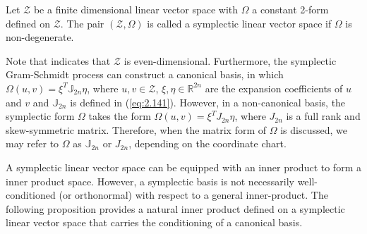 \begin{definition}
Let $\mathcal Z$ be a finite dimensional linear vector space with $\Omega$ a constant 2-form defined on $\mathcal Z$. The pair $(\mathcal Z,\Omega)$ is called a symplectic linear vector space if $\Omega$ is non-degenerate.
\end{definition}
Note that  indicates that $\mathcal Z$ is even-dimensional. Furthermore, the symplectic Gram-Schmidt process can construct a canonical basis, in which $\Omega(u,v) = \xi^T \mathbb J_{2n} \eta$, where $u,v\in \mathcal Z$, $\xi,\eta \in \mathbb R^{2n}$ are the expansion coefficients of $u$ and $v$ and $\mathbb J_{2n}$ is defined in (\ref{eq:2.141}). However, in a non-canonical basis, the symplectic form $\Omega$ takes the form $\Omega(u,v) = \xi^TJ_{2n}\eta$, where $J_{2n}$ is a full rank and skew-symmetric matrix. Therefore, when the matrix form of $\Omega$ is discussed, we may refer to $\Omega$ as $\mathbb J_{2n}$ or $J_{2n}$, depending on the coordinate chart.

A symplectic linear vector space can be equipped with an inner product to form a inner product space. However, a symplectic basis is not necessarily well-conditioned (or orthonormal) with respect to a general inner-product. The following proposition provides a natural inner product defined on a symplectic linear vector space that carries the conditioning of a canonical basis.


